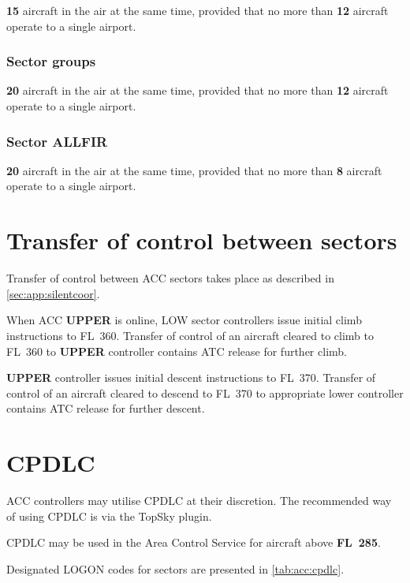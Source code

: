 \textbf{15} aircraft in the air at the same time, provided that no more than
\textbf{12} aircraft operate to a single airport.

\subsubsection{Sector groups}

\textbf{20} aircraft in the air at the same time, provided that no more than
\textbf{12} aircraft operate to a single airport.

\subsubsection{Sector ALLFIR}

\textbf{20} aircraft in the air at the same time, provided that no more than
\textbf{8} aircraft operate to a single airport.

\section{Transfer of control between sectors}

Transfer of control between ACC sectors takes place as described in
\cref{sec:app:silentcoor}.

When ACC \textbf{\color{OliveGreen}UPPER\color{black}} is online, LOW sector controllers
issue initial climb instructions to FL~360. Transfer of control of an aircraft
cleared to climb to FL~360 to \textbf{\color{OliveGreen}UPPER\color{black}} controller
contains ATC release for further climb.

\textbf{\color{OliveGreen}UPPER\color{black}} controller issues initial descent
instructions to FL~370. Transfer of control of an aircraft cleared to descend to
FL~370 to appropriate lower controller contains ATC release for further descent.

\section{CPDLC}
\label{sec:acc:cpdlc}

ACC controllers may utilise CPDLC at their discretion. The recommended way of
using CPDLC is via the TopSky plugin.

CPDLC may be used in the Area Control Service for aircraft above
\textbf{FL~285}.

Designated LOGON codes for sectors are presented in \cref{tab:acc:cpdlc}.

